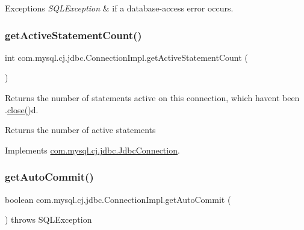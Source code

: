 \begin{DoxyExceptions}{Exceptions}
{\em S\+Q\+L\+Exception} & if a database-\/access error occurs. \\
\hline
\end{DoxyExceptions}
\mbox{\label{classcom_1_1mysql_1_1cj_1_1jdbc_1_1_connection_impl_a858f89a9745e2ffc3e748c91286d7862}} 
\subsubsection{\texorpdfstring{get\+Active\+Statement\+Count()}{getActiveStatementCount()}}
{\footnotesize\ttfamily int com.\+mysql.\+cj.\+jdbc.\+Connection\+Impl.\+get\+Active\+Statement\+Count (\begin{DoxyParamCaption}{ }\end{DoxyParamCaption})}

Returns the number of statements active on this connection, which haven\textquotesingle{}t been .\mbox{\hyperlink{classcom_1_1mysql_1_1cj_1_1jdbc_1_1_connection_impl_a9d82246a207b618a8ce3dfcf349c971d}{close()}}d.

\begin{DoxyReturn}{Returns}
the number of active statements 
\end{DoxyReturn}


Implements \mbox{\hyperlink{interfacecom_1_1mysql_1_1cj_1_1jdbc_1_1_jdbc_connection_aea218879f6bae7ed7717a257876582db}{com.\+mysql.\+cj.\+jdbc.\+Jdbc\+Connection}}.

\mbox{\label{classcom_1_1mysql_1_1cj_1_1jdbc_1_1_connection_impl_a9c1ff3f925f011a393add7da7dae1871}} 
\subsubsection{\texorpdfstring{get\+Auto\+Commit()}{getAutoCommit()}}
{\footnotesize\ttfamily boolean com.\+mysql.\+cj.\+jdbc.\+Connection\+Impl.\+get\+Auto\+Commit (\begin{DoxyParamCaption}{ }\end{DoxyParamCaption}) throws S\+Q\+L\+Exception}

